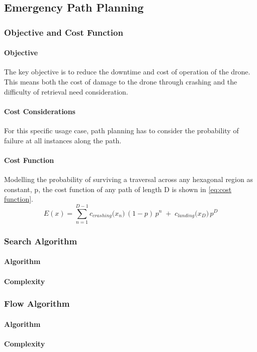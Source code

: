 \subsection{Emergency Path Planning}

\subsubsection{Objective and Cost Function}
\paragraph{Objective}
The key objective is to reduce the downtime and cost of operation of the drone. This means both the cost of damage to the drone through crashing and the difficulty of retrieval need consideration.
\paragraph{Cost Considerations}
For this specific usage case, path planning has to consider the probability of failure at all instances along the path. 
\paragraph{Cost Function}
Modelling the probability of surviving a traversal across any hexagonal region as constant, p, the cost function of any path of length D is shown in \ref{eq:cost function}.
\begin{equation}\label{eq:cost function}
    E(x) 
    = \sum_{n=1}^{D-1} c_{crashing}\bigl(x_n\bigr)\, (1-p) \,p^n 
    \;+\; c_{landing}\bigl(x_D\bigr)\, p^D
\end{equation}


\subsubsection{Search Algorithm}
\paragraph{Algorithm}
\paragraph{Complexity}

\subsubsection{Flow Algorithm}
\paragraph{Algorithm}
\paragraph{Complexity}
